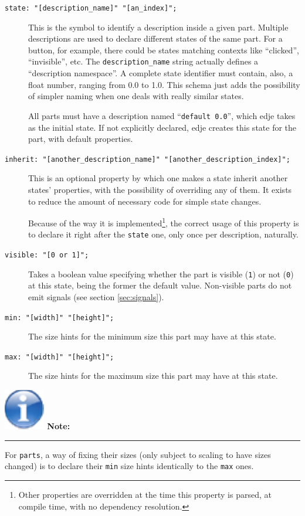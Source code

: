 \documentclass[a4paper]{profusion}
\newenvironment{myboxenv}[1]
  {
    \begin{flushright}
      \begin{boxedminipage}{0.9\textwidth}
        \textbf{%
          \large #1:}

        \hspace{-5pt}\rule{0.3\textwidth}{0.5pt}
        \begin{center}
          \begin{minipage}{0.95\textwidth}

            \small%
         }
          {
          \end{minipage}
        \end{center}
      \end{boxedminipage}
    \end{flushright}
 }
\newenvironment{note}
  {
    \begin{myboxenv}{
        \includegraphics[scale=0.4]{images/note.pdf}
        Note}
   }
    {
    \end{myboxenv}
 }
\begin{document}
\begin{description}
\item[\texttt{state: "[description\_name]" "[an\_index]";}] This is
  the symbol to identify a description inside a given part.  Multiple
  descriptions are used to declare different states of the same
  part. For a button, for example, there could be states matching
  contexts like ``clicked'', ``invisible'', etc.  The
  \texttt{description\_name} string actually defines a ``description
  namespace''. A complete state identifier must contain, also, a float
  number, ranging from 0.0 to 1.0. This schema just adds the
  possibility of simpler naming when one deals with really similar
  states.

  All parts must have a description named ``\texttt{default 0.0}'',
  which edje takes as the initial state. If not explicitly declared,
  edje creates this state for the part, with default properties.

\item[\texttt{inherit: "[another\_description\_name]"
    "[another\_description\_index]";}] This is an optional property by
  which one makes a state inherit another states' properties, with the
  possibility of overriding any of them. It exists to reduce the
  amount of necessary code for simple state changes.

  Because of the way it is implemented\footnote{Other properties are
    overridden at the time this property is parsed, at compile time,
    with no dependency resolution.}, the correct usage of this
  property is to declare it right after the \texttt{state} one, only
  once per description, naturally.

\item[\texttt{visible: "[0 or 1]";}] Takes a boolean value specifying
  whether the part is visible (\texttt{1}) or not (\texttt{0}) at this
  state, being the former the default value. Non-visible parts do not
  emit signals (see section \ref{sec:signals}).

\item[\texttt{min: "[width]" "[height]";}] The size hints for the
  minimum size this part may have at this state.

\item[\texttt{max: "[width]" "[height]";}] The size hints for the
  maximum size this part may have at this state.
\end{description}

\begin{note}
  For \texttt{parts}, a way of fixing their sizes (only subject to
  scaling to have sizes changed) is to declare their \texttt{min} size
  hints identically to the \texttt{max} ones.
\end{note}
\end{document}

